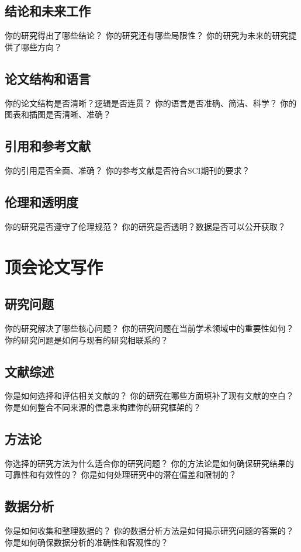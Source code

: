 \documentclass[12pt]{book}
\begin{document}
\subsection{结论和未来工作}
你的研究得出了哪些结论？
你的研究还有哪些局限性？
你的研究为未来的研究提供了哪些方向？

\subsection{论文结构和语言}
你的论文结构是否清晰？逻辑是否连贯？
你的语言是否准确、简洁、科学？
你的图表和插图是否清晰、准确？

\subsection{引用和参考文献}
你的引用是否全面、准确？
你的参考文献是否符合SCI期刊的要求？

\subsection{伦理和透明度}
你的研究是否遵守了伦理规范？
你的研究是否透明？数据是否可以公开获取？


\section{顶会论文写作}
\subsection{研究问题}
你的研究解决了哪些核心问题？
你的研究问题在当前学术领域中的重要性如何？
你的研究问题是如何与现有的研究相联系的？

\subsection{文献综述}
你是如何选择和评估相关文献的？
你的研究在哪些方面填补了现有文献的空白？
你是如何整合不同来源的信息来构建你的研究框架的？

\subsection{方法论}
你选择的研究方法为什么适合你的研究问题？
你的方法论是如何确保研究结果的可靠性和有效性的？
你是如何处理研究中的潜在偏差和限制的？

\subsection{数据分析}
你是如何收集和整理数据的？
你的数据分析方法是如何揭示研究问题的答案的？
你是如何确保数据分析的准确性和客观性的？
\end{document}
